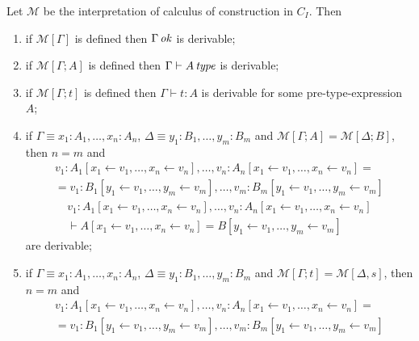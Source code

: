 \begin{theorem} 
    Let $\mathcal{M}$ be the interpretation of calculus of construction in $C_I$. Then 
    \begin{enumerate}
        \item if $\mathcal{M}[\Gamma]$ is defined then $\Gamma \operatorname{\mathit{\space ok}}$ is derivable;
        \item if $\mathcal{M}[\Gamma ; A]$ is defined then $\Gamma \vdash A \operatorname{\mathit{\space type}}$ is derivable;
        \item if $\mathcal{M}[\Gamma; t]$ is defined then $\Gamma \vdash t \colon A$ is derivable for some pre-type-expression $A$;
        \item if $\Gamma \equiv x_1 \colon A_1, \dots, x_n \colon A_n$, $\Delta \equiv y_1 \colon B_1, \dots, y_m \colon B_m$
              and $\mathcal{M}[\Gamma; A] = \mathcal{M}[\Delta; B]$, then $n = m$ and 
              \begin{multline*} 
                    v_1 \colon A_1 [x_1  \leftarrow  v_1, \dots, x_n  \leftarrow  v_n], \dots, v_n \colon A_n[x_1  \leftarrow  v_1, \dots, x_n  \leftarrow  v_n]
                = \\ =
                    v_1 \colon B_1 [y_1  \leftarrow  v_1, \dots, y_m  \leftarrow  v_m], \dots, v_m \colon B_m[y_1  \leftarrow  v_1, \dots, y_m  \leftarrow  v_m]
              \end{multline*}
              \begin{multline*}
                    v_1 \colon A_1 [x_1  \leftarrow  v_1, \dots, x_n  \leftarrow  v_n], \dots, v_n \colon A_n[x_1  \leftarrow  v_1, \dots, x_n  \leftarrow  v_n] \\
                \vdash
                    A[x_1  \leftarrow  v_1, \dots, x_n  \leftarrow  v_n] = B[y_1  \leftarrow  v_1, \dots, y_m  \leftarrow  v_m]
              \end{multline*}
              are derivable;
        \item if $\Gamma \equiv x_1 \colon A_1, \dots, x_n \colon A_n$, $\Delta \equiv y_1 \colon B_1, \dots, y_m \colon B_m$
              and $\mathcal{M}[\Gamma; t] = \mathcal{M}[\Delta, s]$, then $n = m$ and
              \begin{multline*} 
                    v_1 \colon A_1 [x_1  \leftarrow  v_1, \dots, x_n  \leftarrow  v_n], \dots, v_n \colon A_n[x_1  \leftarrow  v_1, \dots, x_n  \leftarrow  v_n]
                = \\ =
                    v_1 \colon B_1 [y_1  \leftarrow  v_1, \dots, y_m  \leftarrow  v_m], \dots, v_m \colon B_m[y_1  \leftarrow  v_1, \dots, y_m  \leftarrow  v_m]

\end{multline*}
\end{enumerate}
\end{theorem}
